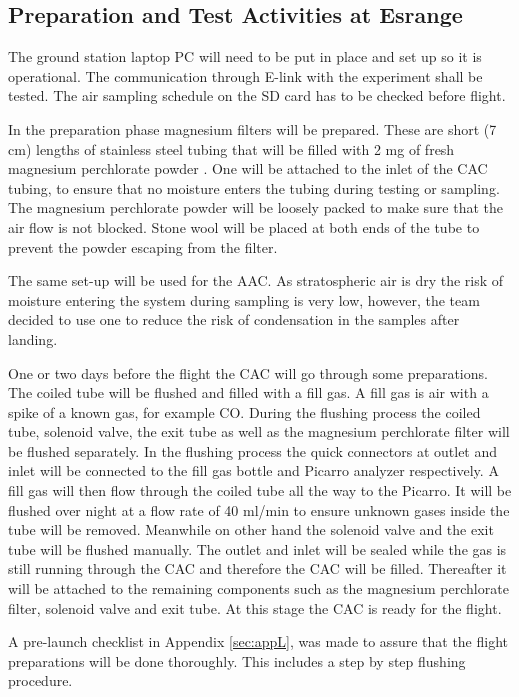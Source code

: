 \subsection{Preparation and Test Activities at Esrange}\label{prep_for_Esrange}
The ground station laptop PC will need to be put in place and set up so it is operational. The communication through E-link with the experiment shall be tested. The air sampling schedule on the SD card has to be checked before flight.

In the preparation phase magnesium filters will be prepared. These are short (7 cm) lengths of stainless steel tubing that will be filled with 2 mg of fresh magnesium perchlorate powder \cite{Karion}. One will be attached to the inlet of the CAC tubing, to ensure that no moisture enters the tubing during testing or sampling. The magnesium perchlorate powder will be loosely packed to make sure that the air flow is not blocked. Stone wool will be placed at both ends of the tube to prevent the powder escaping from the filter.

The same set-up will be used for the AAC. As stratospheric air is dry the risk of moisture entering the system during sampling is very low, however, the team decided to use one to reduce the risk of condensation in the samples after landing. 

One or two days before the flight the CAC will go through some preparations. The coiled tube will be flushed and filled with a fill gas. A fill gas is air with a spike of a known gas, for example CO. During the flushing process the coiled tube, solenoid valve, the exit tube as well as the magnesium perchlorate filter will be flushed separately. In the flushing process the quick connectors at outlet and inlet will be connected to the fill gas bottle and Picarro analyzer respectively. A fill gas will then flow through the coiled tube all the way to the Picarro. It will be flushed over night at a flow rate of 40 ml/min to ensure unknown gases inside the tube will be removed. Meanwhile on other hand the solenoid valve and the exit tube will be flushed manually. The outlet and inlet will be sealed while the gas is still running through the CAC and therefore the CAC will be filled. Thereafter it will be attached to the remaining components such as the magnesium perchlorate filter, solenoid valve and exit tube. At this stage the CAC is ready for the flight. 

A pre-launch checklist in Appendix \ref{sec:appL}, was made to assure that the flight preparations will be done thoroughly. This includes a step by step flushing procedure.

